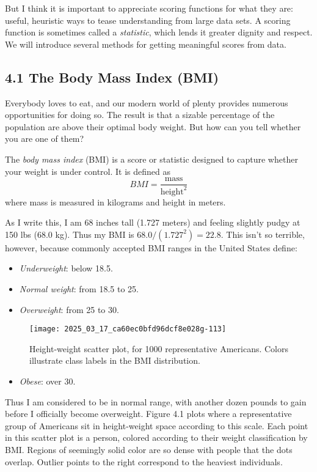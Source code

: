 \documentclass[10pt]{article}
\begin{document}
But I think it is important to appreciate scoring functions for what they are: useful, heuristic ways to tease understanding from large data sets. A scoring function is sometimes called a \textit{statistic}, which lends it greater dignity and respect. We will introduce several methods for getting meaningful scores from data.

\subsection*{4.1 The Body Mass Index (BMI)}
Everybody loves to eat, and our modern world of plenty provides numerous opportunities for doing so. The result is that a sizable percentage of the population are above their optimal body weight. But how can you tell whether you are one of them?

The \textit{body mass index} (BMI) is a score or statistic designed to capture whether your weight is under control. It is defined as
\[
BMI = \frac{\text{mass}}{\text{height}^{2}}
\]
where mass is measured in kilograms and height in meters.

As I write this, I am 68 inches tall (1.727 meters) and feeling slightly pudgy at 150 lbs (68.0 kg). Thus my BMI is \(68.0 / (1.727^2) = 22.8\). This isn't so terrible, however, because commonly accepted BMI ranges in the United States define:
\begin{itemize}
  \item \textit{Underweight}: below 18.5.
  \item \textit{Normal weight}: from 18.5 to 25.
  \item \textit{Overweight}: from 25 to 30.
\end{itemize}

\begin{figure}[h]
\centering
\texttt{[image: 2025\_03\_17\_ca60ec0bfd96dcf8e028g-113]}
\caption{Height-weight scatter plot, for 1000 representative Americans. Colors illustrate class labels in the BMI distribution.}
\end{figure}

\begin{itemize}
  \item \textit{Obese}: over 30.
\end{itemize}

Thus I am considered to be in normal range, with another dozen pounds to gain before I officially become overweight. Figure 4.1 plots where a representative group of Americans sit in height-weight space according to this scale. Each point in this scatter plot is a person, colored according to their weight classification by BMI. Regions of seemingly solid color are so dense with people that the dots overlap. Outlier points to the right correspond to the heaviest individuals.
\end{document}
